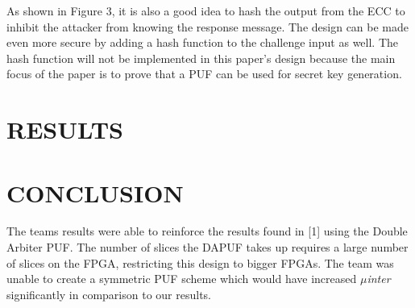 \documentclass[letterpaper, 10 pt, conference]{ieeeconf}  %
\begin{document}
As shown in Figure 3, it is also a good idea to hash the output from the ECC to inhibit the attacker from knowing the response message.  The design can be made even more secure by adding a hash function to the challenge input as well.  The hash function will not be implemented in this paper's design because the main focus of the paper is to prove that a PUF can be used for secret key generation.  

\section{RESULTS}
 

\section{CONCLUSION}

The teams results were able to reinforce the results found in [1] using the Double Arbiter PUF. The number of slices the DAPUF takes up requires a large number of slices on the FPGA, restricting this design to bigger FPGAs. The team was unable to create a symmetric PUF scheme which would have increased \emph{$\mu$inter} significantly in comparison to our results.

\addtolength{\textheight}{-12cm}   %









\end{document}
